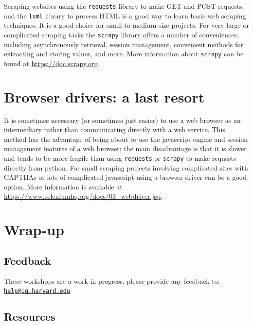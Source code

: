 \documentclass[]{book}
\begin{document}
Scraping websites using the \texttt{requests} library to make GET and
POST requests, and the \texttt{lxml} library to process HTML is a good
way to learn basic web scraping techniques. It is a good choice for
small to medium size projects. For very large or complicated scraping
tasks the \texttt{scrapy} library offers a number of conveniences,
including asynchronously retrieval, session management, convenient
methods for extracting and storing values, and more. More information
about \texttt{scrapy} can be found at \url{https://doc.scrapy.org}.

\section{Browser drivers: a last
resort}\label{browser-drivers-a-last-resort}

It is sometimes necessary (or sometimes just easier) to use a web
browser as an intermediary rather than communicating directly with a web
service. This method has the advantage of being about to use the
javascript engine and session management features of a web browser; the
main disadvantage is that it is slower and tends to be more fragile than
using \texttt{requests} or \texttt{scrapy} to make requests directly
from python. For small scraping projects involving complicated sites
with CAPTHAs or lots of complicated javascript using a browser driver
can be a good option. More information is available at
\url{https://www.seleniumhq.org/docs/03_webdriver.jsp}.

\section{Wrap-up}\label{wrap-up-6}

\subsection{Feedback}\label{feedback-6}

These workshops are a work in progress, please provide any feedback to:
\href{mailto:help@iq.harvard.edu}{\nolinkurl{help@iq.harvard.edu}}

\subsection{Resources}\label{resources-6}
\end{document}
